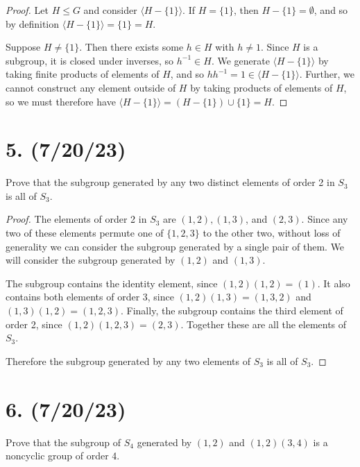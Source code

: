 \documentclass{article}
\begin{document}
\begin{proof}
    Let $H \leq G$ and consider $\langle H - \{ 1 \} \rangle$. If $H = \{ 1 \}$, then $H - \{ 1 \} = \emptyset$, and so by definition $\langle H - \{ 1 \} \rangle = \{ 1 \} = H$.

    Suppose $H \neq \{ 1 \}$. Then there exists some $h \in H$ with $h \neq 1$. Since $H$ is a subgroup, it is closed under inverses, so $h^{-1} \in H$. We generate $\langle H - \{ 1 \} \rangle$ by taking finite products of elements of $H$, and so $hh^{-1} = 1 \in \langle H - \{ 1 \} \rangle$. Further, we cannot construct any element outside of $H$ by taking products of elements of $H$, so we must therefore have $\langle H - \{ 1 \} \rangle = (H - \{ 1 \}) \cup \{ 1 \} = H$.
\end{proof}

\section*{5. (7/20/23)}

Prove that the subgroup generated by any two distinct elements of order 2 in $S_3$ is all of $S_3$.

\begin{proof}
    The elements of order 2 in $S_3$ are $(1, 2), (1, 3)$, and $(2, 3)$. Since any two of these elements permute one of $\{ 1, 2, 3 \}$ to the other two, without loss of generality we can consider the subgroup generated by a single pair of them. We will consider the subgroup generated by $(1, 2)$ and $(1, 3)$.

    The subgroup contains the identity element, since $(1, 2)(1, 2) = (1)$. It also contains both elements of order 3, since $(1, 2)(1, 3) = (1, 3, 2)$ and $(1, 3)(1, 2) = (1, 2, 3)$. Finally, the subgroup contains the third element of order 2, since $(1, 2)(1, 2, 3) = (2, 3)$. Together these are all the elements of $S_3$.

    Therefore the subgroup generated by any two elements of $S_3$ is all of $S_3$.
\end{proof}

\section*{6. (7/20/23)}

Prove that the subgroup of $S_4$ generated by $(1, 2)$ and $(1, 2)(3, 4)$ is a noncyclic group of order 4.
\end{document}
